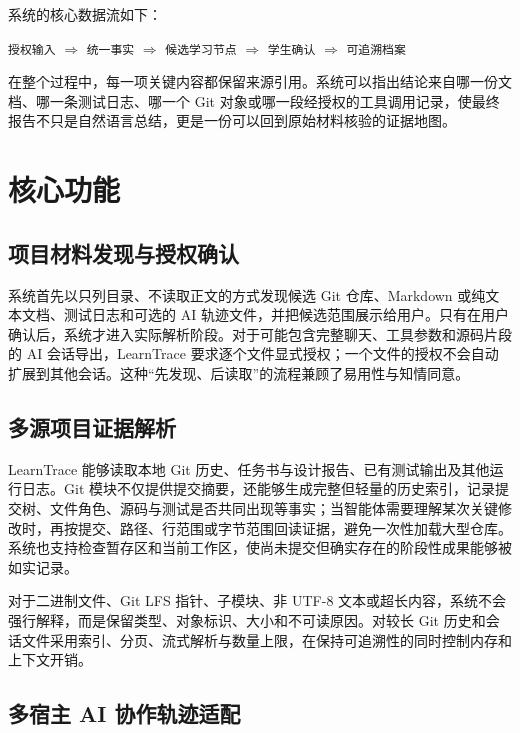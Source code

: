 \documentclass[UTF8,a4paper,12pt]{ctexart}
\begin{document}
系统的核心数据流如下：

\begin{center}
\small
\texttt{授权输入}
$\Rightarrow$
\texttt{统一事实}
$\Rightarrow$
\texttt{候选学习节点}
$\Rightarrow$
\texttt{学生确认}
$\Rightarrow$
\texttt{可追溯档案}
\end{center}

在整个过程中，每一项关键内容都保留来源引用。系统可以指出结论来自哪一份文档、哪一条测试日志、哪一个 Git 对象或哪一段经授权的工具调用记录，使最终报告不只是自然语言总结，更是一份可以回到原始材料核验的证据地图。

\section{核心功能}

\subsection{项目材料发现与授权确认}

系统首先以只列目录、不读取正文的方式发现候选 Git 仓库、Markdown 或纯文本文档、测试日志和可选的 AI 轨迹文件，并把候选范围展示给用户。只有在用户确认后，系统才进入实际解析阶段。对于可能包含完整聊天、工具参数和源码片段的 AI 会话导出，LearnTrace 要求逐个文件显式授权；一个文件的授权不会自动扩展到其他会话。这种“先发现、后读取”的流程兼顾了易用性与知情同意。

\subsection{多源项目证据解析}

LearnTrace 能够读取本地 Git 历史、任务书与设计报告、已有测试输出及其他运行日志。Git 模块不仅提供提交摘要，还能够生成完整但轻量的历史索引，记录提交树、文件角色、源码与测试是否共同出现等事实；当智能体需要理解某次关键修改时，再按提交、路径、行范围或字节范围回读证据，避免一次性加载大型仓库。系统也支持检查暂存区和当前工作区，使尚未提交但确实存在的阶段性成果能够被如实记录。

对于二进制文件、Git LFS 指针、子模块、非 UTF-8 文本或超长内容，系统不会强行解释，而是保留类型、对象标识、大小和不可读原因。对较长 Git 历史和会话文件采用索引、分页、流式解析与数量上限，在保持可追溯性的同时控制内存和上下文开销。

\subsection{多宿主 AI 协作轨迹适配}
\end{document}
